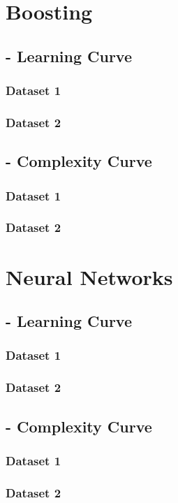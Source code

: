 \documentclass[letterpaper,12pt]{article}
\begin{document}
\section*{Boosting}
\subsection*{- Learning Curve}
\subsubsection*{	Dataset 1}
\subsubsection*{	Dataset 2}

\subsection*{- Complexity Curve}
\subsubsection*{	Dataset 1}
\subsubsection*{	Dataset 2}

\section*{Neural Networks}
\subsection*{- Learning Curve}
\subsubsection*{	Dataset 1}
\subsubsection*{	Dataset 2}

\subsection*{- Complexity Curve}
\subsubsection*{	Dataset 1}
\subsubsection*{	Dataset 2}
\end{document}
